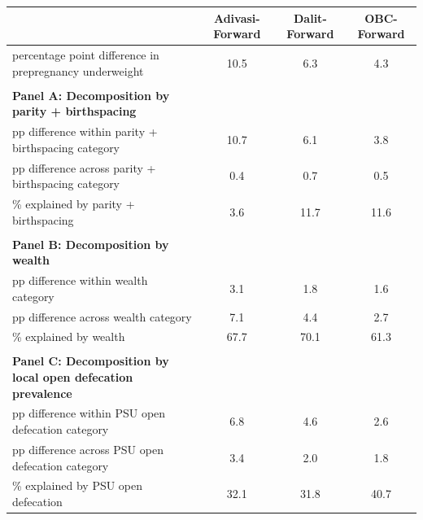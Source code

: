 \begin{tabular}{lccc}
\toprule
 & Adivasi-Forward & Dalit-Forward & OBC-Forward \\
\midrule
percentage point difference in prepregnancy underweight&10.5&6.3&4.3\\
&&&\\
\textbf{Panel A: Decomposition by parity + birthspacing}&&&\\
pp difference within parity + birthspacing category&10.7&6.1&3.8\\
pp difference across parity + birthspacing category&0.4&0.7&0.5\\
\% explained by parity + birthspacing&3.6&11.7&11.6\\
&&&\\
\textbf{Panel B: Decomposition by wealth}&&&\\
pp difference within wealth category&3.1&1.8&1.6\\
pp difference across wealth category&7.1&4.4&2.7\\
\% explained by wealth&67.7&70.1&61.3\\
&&&\\
\textbf{Panel C: Decomposition by local open defecation prevalence}&&&\\
pp difference within PSU open defecation category&6.8&4.6&2.6\\
pp difference across PSU open defecation category&3.4&2.0&1.8\\
\% explained by PSU open defecation&32.1&31.8&40.7\\
\bottomrule
\end{tabular}
